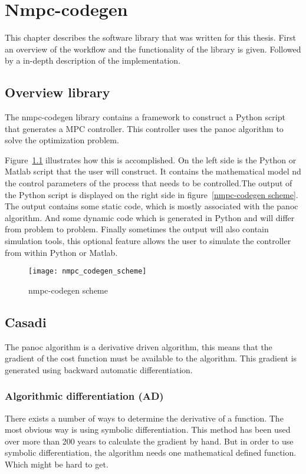 \chapter{Nmpc-codegen}
This chapter describes the software library that was written for this thesis. First an overview of the workflow and the functionality of the library is given. Followed by a in-depth description of the implementation.
\section{Overview library}
The nmpc-codegen library contains a framework to construct a Python script that generates a MPC controller. This controller uses the panoc algorithm to solve the optimization problem.

Figure~\ref{fig:nmpc-codegen scheme} illustrates how this is accomplished. On the left side is the Python or Matlab script that the user will construct. It contains the mathematical model nd the control parameters of the process that needs to be controlled.The output of the Python script is displayed on the right side in figure~\ref{nmpc-codegen scheme}. The output contains some static code, which is mostly associated with the panoc algorithm. And some dynamic code which is generated in Python and will differ from problem to problem. Finally sometimes the output will also contain simulation tools, this optional feature allows the user to simulate the controller from within Python or Matlab.
	\begin{figure}[H]
		\centering
		\texttt{[image: nmpc\_codegen\_scheme]}
		\caption{nmpc-codegen scheme}
		\label{fig:nmpc-codegen scheme}
	\end{figure}

\section{Casadi}
The panoc algorithm is a derivative driven algorithm, this means that the gradient of the cost function must be available to the algorithm. This gradient is generated using backward automatic differentiation.

\subsection{Algorithmic differentiation (AD)}
There exists a number of ways to determine the derivative of a function. The most obvious way is using symbolic differentiation. This method has been used over more than 200 years to calculate the gradient by hand. But in order to use symbolic differentiation, the algorithm needs one mathematical defined function. Which might be hard to get.


